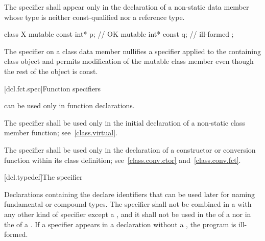 \pnum
The  specifier shall appear only in the declaration of
a non-static data member
whose type is neither const-qualified nor a reference type.
\begin{example}
\begin{codeblock}
class X {
  mutable const int* p;         // OK
  mutable int* const q;         // ill-formed
};
\end{codeblock}
\end{example}

\pnum
The  specifier on a class data member nullifies a
 specifier applied to the containing class object and
permits modification of the mutable class member even though the rest of
the object is const.

[dcl.fct.spec]{Function specifiers}%
%

\pnum
{}
can be used only in function declarations.

\begin{bnf}
\br
    \br
\end{bnf}

\pnum
{}%
The  specifier shall be used only in the initial
declaration of a non-static class member function;
see~\ref{class.virtual}.

\pnum
{}%
The  specifier shall be used only in the declaration of
a constructor or conversion function within its class definition;
see~\ref{class.conv.ctor} and~\ref{class.conv.fct}.

[dcl.typedef]{The  specifier}%

\pnum
Declarations containing the  
declare identifiers that can be used later for naming
fundamental or compound
types. The  specifier shall not be
combined in a  with any other kind of
specifier except a , and it shall not be used in the
 of a
 nor in the
 of a
.
If a  specifier appears in a declaration without a ,
the program is ill-formed.

